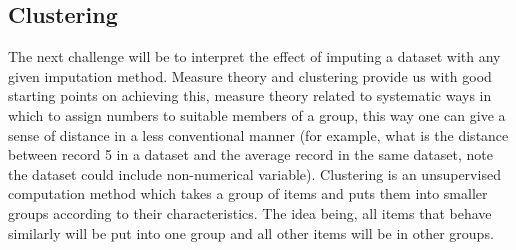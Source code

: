 \documentclass{IEEEconf}
\begin{document}
		\subsection{Clustering} %
		\label{sub:clustering}
		
		The next challenge will be to interpret the effect of imputing a dataset with any given imputation method. Measure theory and clustering provide us with good starting points on achieving this, measure theory related to systematic ways in which to assign numbers to suitable members of a group, this way one can give a sense of distance in a less conventional manner (for example, what is the distance between record 5 in a dataset and the average record in the same dataset, note the dataset could include non-numerical variable). Clustering is an unsupervised computation method which takes a group of items and puts them into smaller groups according to their characteristics. The idea being, all items that behave similarly will be put into one group and all other items will be in other groups.



\end{document}
